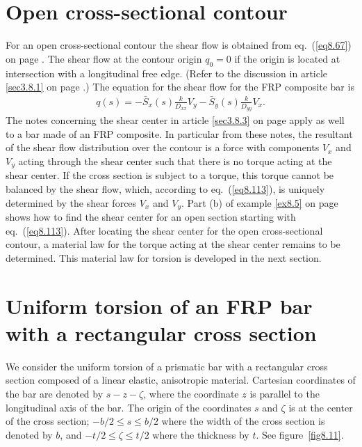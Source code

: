 \documentclass{AeroStructure-ERJohnson}
\begin{document}
\section{Open cross-sectional contour}\label{sec8.3}

For an open cross-sectional contour the shear flow is obtained
from eq.~(\ref{eq8.67}) on page \pageref{eq8.67}. The shear flow at the contour
origin $q_{0}=0$ if the origin is located at intersection with a
longitudinal free edge. (Refer to the discussion in article \ref{sec3.8.1}
on page \pageref{sec3.8.1}.) The equation for the shear flow for the FRP composite
bar is
\begin{align}\label{eq8.113}
q(s)=-\bar{S}_{x}(s) \frac{k}{D_{x x}} V_{y}-\bar{S}_{y}(s)
\frac{k}{D_{y y}} V_{x}.
\end{align}
The notes concerning the shear center in article \ref{sec3.8.3} on page \pageref{sec3.8.3}
apply as well to a bar made of an FRP composite. In particular
from these notes, the resultant of the shear flow distribution
over the contour is a force with components $V_x$ and
$V_y$ acting through the shear center such that there is no
torque acting at the shear center. If the cross section is subject
to a torque, this torque cannot be balanced by the shear flow,
which, according to eq.~(\ref{eq8.113}), is uniquely determined by
the shear forces $V_x$ and $V_y$. Part (b) of example
\ref{ex8.5} on page \pageref{ex8.5} shows how to find the shear center for an open
section starting with eq.~(\ref{eq8.113}). After locating the
shear center for the open cross-sectional contour, a material law
for the torque acting at the shear center remains to be
determined. This material law for torsion is developed in the next
section.

\section{Uniform torsion of an FRP bar with a rectangular cross section}\label{sec8.4}

We consider the uniform torsion of a prismatic bar with a
rectangular cross section composed of a linear elastic,
anisotropic material. Cartesian coordinates of the bar are denoted
by $s-z-\zeta$, where the coordinate $z$ is parallel to
the longitudinal axis of the bar. The origin of the coordinates
$s$ and $\zeta$ is at the center of the cross section; $-b/ 2 \leq s
\leq b/ 2$ where the width of the cross section is denoted by
$b$, and $-t/ 2 \leq \zeta \leq t/ 2$ where the thickness by
$t$. See figure~\ref{fig8.11}.
\end{document}
